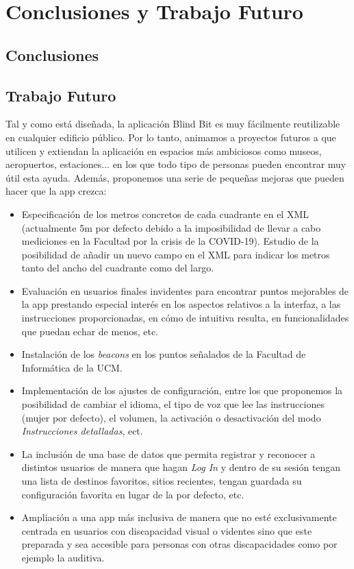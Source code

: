 \chapter{Conclusiones y Trabajo Futuro}
\label{cap:conclusiones}

\section{Conclusiones}

\section{Trabajo Futuro}

Tal y como está diseñada, la aplicación Blind Bit es muy fácilmente reutilizable en cualquier edificio público. Por lo tanto, animamos a proyectos futuros a que utilicen y extiendan la aplicación en espacios más ambiciosos como museos, aeropuertos, estaciones... en los que todo tipo de personas pueden encontrar muy útil esta ayuda. Además, proponemos una serie de pequeñas mejoras que pueden hacer que la app crezca:
\begin{itemize}
	\item Especificación de los metros concretos de cada cuadrante en el XML (actualmente 5m por defecto debido a la imposibilidad de llevar a cabo mediciones en la Facultad por la crisis de la COVID-19). Estudio de la posibilidad de añadir un nuevo campo en el XML para indicar los metros tanto del ancho del cuadrante como del largo.
	\item Evaluación en usuarios finales invidentes para encontrar puntos mejorables de la app prestando especial interés en los aspectos relativos a la interfaz, a las instrucciones proporcionadas, en cómo de intuitiva resulta, en funcionalidades que puedan echar de menos, etc.
	\item Instalación de los \textit{beacons} en los puntos señalados de la Facultad de Informática de la UCM.
	\item Implementación de los ajustes de configuración, entre los que proponemos la posibilidad de cambiar el idioma, el tipo de voz que lee las instrucciones (mujer por defecto), el volumen, la activación o desactivación del modo\textit{ Instrucciones detalladas}, ect. 
	\item La inclusión de una base de datos que permita registrar y reconocer a distintos usuarios de manera que hagan \textit{Log In} y dentro de su sesión tengan una lista de destinos favoritos, sitios recientes, tengan guardada su configuración favorita en lugar de la por defecto, etc.
	\item Ampliación a una app más inclusiva de manera que no esté exclusivamente centrada en usuarios con discapacidad visual o videntes sino que este preparada y sea accesible para personas con otras discapacidades como por ejemplo la auditiva.
	
\end{itemize}


